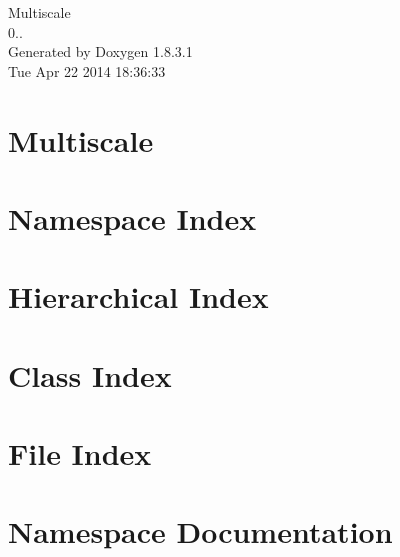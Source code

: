 \documentclass{book}
\begin{document}
\hypersetup{pageanchor=false,citecolor=blue}
\begin{titlepage}
\vspace*{7cm}
\begin{center}
{\Large Multiscale \\[1ex]\large 0.. }\\
\vspace*{1cm}
{\large Generated by Doxygen 1.8.3.1}\\
\vspace*{0.5cm}
{\small Tue Apr 22 2014 18:36:33}\\
\end{center}
\end{titlepage}
\clearemptydoublepage
{}
\tableofcontents
\clearemptydoublepage
{}
\hypersetup{pageanchor=true,citecolor=blue}
\chapter{Multiscale}
\label{index}\hypertarget{index}{}
\chapter{Namespace Index}

\chapter{Hierarchical Index}

\chapter{Class Index}

\chapter{File Index}

\chapter{Namespace Documentation}






\end{document}
